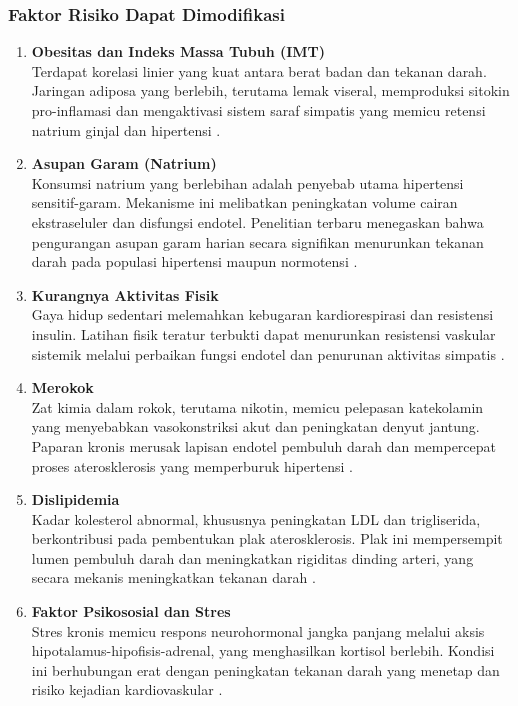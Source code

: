 \subsubsection{Faktor Risiko Dapat Dimodifikasi}
\begin{enumerate}
    \item \textbf{Obesitas dan Indeks Massa Tubuh (IMT)} \\
    Terdapat korelasi linier yang kuat antara berat badan dan tekanan darah. Jaringan adiposa yang berlebih, terutama lemak viseral, memproduksi sitokin pro-inflamasi dan mengaktivasi sistem saraf simpatis yang memicu retensi natrium ginjal dan hipertensi \parencite{Kaufman1997BP_BMI_Lean}.
    
    \item \textbf{Asupan Garam (Natrium)} \\
    Konsumsi natrium yang berlebihan adalah penyebab utama hipertensi sensitif-garam. Mekanisme ini melibatkan peningkatan volume cairan ekstraseluler dan disfungsi endotel. Penelitian terbaru menegaskan bahwa pengurangan asupan garam harian secara signifikan menurunkan tekanan darah pada populasi hipertensi maupun normotensi \parencite{Grillo2019Sodium}.
    
    \item \textbf{Kurangnya Aktivitas Fisik} \\
    Gaya hidup sedentari melemahkan kebugaran kardiorespirasi dan resistensi insulin. Latihan fisik teratur terbukti dapat menurunkan resistensi vaskular sistemik melalui perbaikan fungsi endotel dan penurunan aktivitas simpatis \parencite{Boutcher2020Exercise}.
    
    \item \textbf{Merokok} \\
    Zat kimia dalam rokok, terutama nikotin, memicu pelepasan katekolamin yang menyebabkan vasokonstriksi akut dan peningkatan denyut jantung. Paparan kronis merusak lapisan endotel pembuluh darah dan mempercepat proses aterosklerosis yang memperburuk hipertensi \parencite{Benowitz2021Cardiovascular}.
    
    \item \textbf{Dislipidemia} \\
    Kadar kolesterol abnormal, khususnya peningkatan LDL dan trigliserida, berkontribusi pada pembentukan plak aterosklerosis. Plak ini mempersempit lumen pembuluh darah dan meningkatkan rigiditas dinding arteri, yang secara mekanis meningkatkan tekanan darah \parencite{Mongdong2025LDLHipertensi}.
    
    \item \textbf{Faktor Psikososial dan Stres} \\
    Stres kronis memicu respons neurohormonal jangka panjang melalui aksis hipotalamus-hipofisis-adrenal, yang menghasilkan kortisol berlebih. Kondisi ini berhubungan erat dengan peningkatan tekanan darah yang menetap dan risiko kejadian kardiovaskular \parencite{Osborne2020Stress}.
\end{enumerate}

